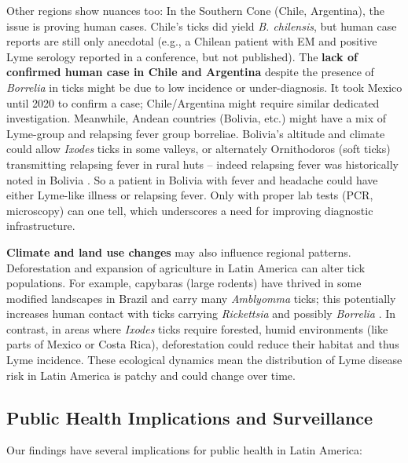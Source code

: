 \documentclass[11pt,letterpaper]{article}
\begin{document}
Other regions show nuances too: In the Southern Cone (Chile, Argentina), the issue is proving human cases. Chile’s ticks did yield \textit{B. chilensis}, but human case reports are still only anecdotal (e.g., a Chilean patient with EM and positive Lyme serology reported in a conference, but not published). The \textbf{lack of confirmed human case in Chile and Argentina} despite the presence of \textit{Borrelia} in ticks might be due to low incidence or under-diagnosis. It took Mexico until 2020 to confirm a case; Chile/Argentina might require similar dedicated investigation. Meanwhile, Andean countries (Bolivia, etc.) might have a mix of Lyme-group and relapsing fever group borreliae. Bolivia’s altitude and climate could allow \textit{Ixodes} ticks in some valleys, or alternately Ornithodoros (soft ticks) transmitting relapsing fever in rural huts – indeed relapsing fever was historically noted in Bolivia \citep{Colunga-Salas2022c}. So a patient in Bolivia with fever and headache could have either Lyme-like illness or relapsing fever. Only with proper lab tests (PCR, microscopy) can one tell, which underscores a need for improving diagnostic infrastructure.

\textbf{Climate and land use changes} may also influence regional patterns. Deforestation and expansion of agriculture in Latin America can alter tick populations. For example, capybaras (large rodents) have thrived in some modified landscapes in Brazil and carry many \textit{Amblyomma} ticks; this potentially increases human contact with ticks carrying \textit{Rickettsia} and possibly \textit{Borrelia} \citep{Jorge2023c, Jorge2023d}. In contrast, in areas where \textit{Ixodes} ticks require forested, humid environments (like parts of Mexico or Costa Rica), deforestation could reduce their habitat and thus Lyme incidence. These ecological dynamics mean the distribution of Lyme disease risk in Latin America is patchy and could change over time.

\subsection{Public Health Implications and Surveillance}
Our findings have several implications for public health in Latin America:
\end{document}
